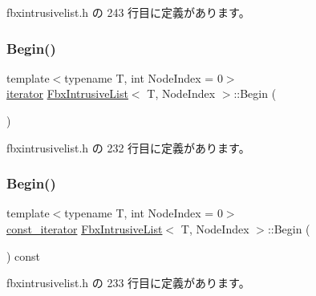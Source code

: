  fbxintrusivelist.\+h の 243 行目に定義があります。

\mbox{\label{class_fbx_intrusive_list_aae6fe870895328f5ec5ec393833faa72}} 
\subsubsection{\texorpdfstring{Begin()}{Begin()}\hspace{0.1cm}{\footnotesize\ttfamily [1/2]}}
{\footnotesize\ttfamily template$<$typename T, int Node\+Index = 0$>$ \\
\hyperlink{class_fbx_intrusive_list_ae1012cd86e3ff0a4a49c982f0d34b4e7}{iterator} \hyperlink{class_fbx_intrusive_list}{Fbx\+Intrusive\+List}$<$ T, Node\+Index $>$\+::Begin (\begin{DoxyParamCaption}{ }\end{DoxyParamCaption})\hspace{0.3cm}{\ttfamily [inline]}}



 fbxintrusivelist.\+h の 232 行目に定義があります。

\mbox{\label{class_fbx_intrusive_list_a6d61be38f14d516be3d5a9e008b95376}} 
\subsubsection{\texorpdfstring{Begin()}{Begin()}\hspace{0.1cm}{\footnotesize\ttfamily [2/2]}}
{\footnotesize\ttfamily template$<$typename T, int Node\+Index = 0$>$ \\
\hyperlink{class_fbx_intrusive_list_a4c0c567c56a712e7ffca9c6bb5990169}{const\+\_\+iterator} \hyperlink{class_fbx_intrusive_list}{Fbx\+Intrusive\+List}$<$ T, Node\+Index $>$\+::Begin (\begin{DoxyParamCaption}{ }\end{DoxyParamCaption}) const\hspace{0.3cm}{\ttfamily [inline]}}



 fbxintrusivelist.\+h の 233 行目に定義があります。

\mbox{\label{class_fbx_intrusive_list_aa2dc68e4cac0bb5ac2e715e3d9d30ef0}} 
